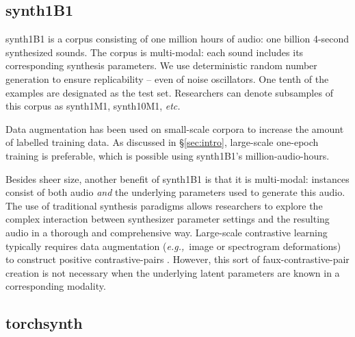 \subsection{synth1B1}
\label{section:synth1B1}

synth1B1 is a corpus consisting of one million hours of audio: one billion 4-second synthesized sounds. The corpus is multi-modal: each sound includes its corresponding synthesis parameters. We use deterministic random number generation to ensure replicability -- even of noise oscillators. One tenth of the examples are designated as the test set. Researchers can denote subsamples of this corpus as synth1M1, synth10M1, {\em etc.} %

Data augmentation has been used on small-scale corpora to increase the amount of labelled training data. As discussed in \S\ref{sec:intro}, large-scale one-epoch training is preferable, which is possible using synth1B1's million-audio-hours.

Besides sheer size, another benefit of synth1B1 is that it is multi-modal: instances consist of both audio {\em and} the underlying parameters used to generate this audio. The use of traditional synthesis paradigms allows researchers to explore the complex interaction between synthesizer parameter settings and the resulting audio in a thorough and comprehensive way. 
Large-scale contrastive learning typically requires data augmentation ({\em e.g.,}\ image or spectrogram deformations) to construct positive contrastive-pairs \cite{pmlr-v119-chen20j,DBLP:journals/corr/abs-2103-06695}. However, this sort of faux-contrastive-pair creation is not necessary when the underlying latent parameters are known in a corresponding modality.

\subsection{torchsynth}
\label{section:torchsynth}

